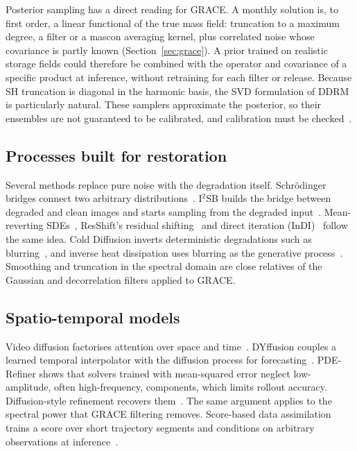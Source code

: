 Posterior sampling has a direct reading for GRACE. A monthly solution is, to first order, a linear functional of the true mass field: truncation to a maximum degree, a filter or a mascon averaging kernel, plus correlated noise whose covariance is partly known (Section~\ref{sec:grace}). A prior trained on realistic storage fields could therefore be combined with the operator and covariance of a specific product at inference, without retraining for each filter or release. Because SH truncation is diagonal in the harmonic basis, the SVD formulation of DDRM is particularly natural. These samplers approximate the posterior, so their ensembles are not guaranteed to be calibrated, and calibration must be checked~\cite{daras2024survey}.

\subsection{Processes built for restoration}

Several methods replace pure noise with the degradation itself. Schrödinger bridges connect two arbitrary distributions~\cite{debortoli2021dsb}. I$^2$SB builds the bridge between degraded and clean images and starts sampling from the degraded input~\cite{liu2023i2sb}. Mean-reverting SDEs~\cite{luo2023irsde}, ResShift's residual shifting~\cite{yue2023resshift} and direct iteration (InDI)~\cite{delbracio2023indi} follow the same idea. Cold Diffusion inverts deterministic degradations such as blurring~\cite{bansal2023cold}, and inverse heat dissipation uses blurring as the generative process~\cite{rissanen2023heat}. Smoothing and truncation in the spectral domain are close relatives of the Gaussian and decorrelation filters applied to GRACE.

\subsection{Spatio-temporal models}

Video diffusion factorises attention over space and time~\cite{ho2022video}. DYffusion couples a learned temporal interpolator with the diffusion process for forecasting~\cite{ruhlingcachay2023dyffusion}. PDE-Refiner shows that solvers trained with mean-squared error neglect low-amplitude, often high-frequency, components, which limits rollout accuracy. Diffusion-style refinement recovers them~\cite{lippe2023pderefiner}. The same argument applies to the spectral power that GRACE filtering removes. Score-based data assimilation trains a score over short trajectory segments and conditions on arbitrary observations at inference~\cite{rozet2023sda}.

